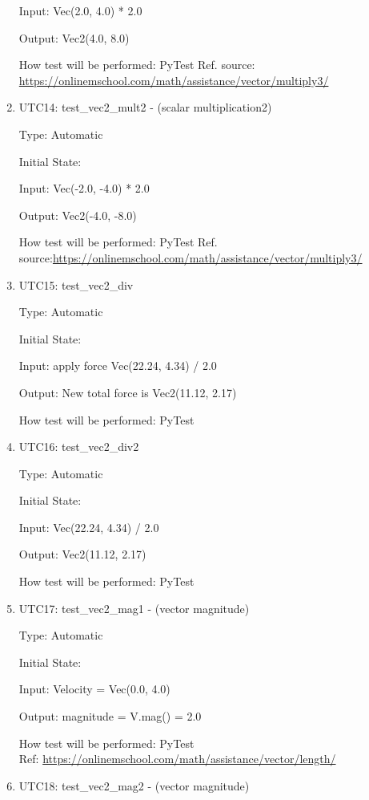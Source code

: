 \documentclass[12pt, titlepage]{article}
\begin{document}
\begin{enumerate}
	Input: Vec(2.0, 4.0) * 2.0
	
	Output: Vec2(4.0, 8.0)
	
	How test will be performed: PyTest
	Ref. source: \url{https://onlinemschool.com/math/assistance/vector/multiply3/}
	
	\item{UTC14}{: test\_vec2\_mult2 - (scalar multiplication2)\\}
	
	Type: Automatic
	
	Initial State: 
	
	Input:  Vec(-2.0, -4.0) * 2.0
	
	Output:  Vec2(-4.0, -8.0)
	
	How test will be performed: PyTest
	Ref. source:\url{https://onlinemschool.com/math/assistance/vector/multiply3/}
	
	\item{UTC15}{: test\_vec2\_div\\}
	
	Type: Automatic
	
	Initial State: 
	
	Input: apply force Vec(22.24, 4.34) / 2.0
	
	Output: New total force is Vec2(11.12, 2.17)
	
	How test will be performed: PyTest
	
	\item{UTC16}{: test\_vec2\_div2\\}
	
	Type: Automatic
	
	Initial State: 
	
	Input: Vec(22.24, 4.34) / 2.0
	
	Output: Vec2(11.12, 2.17)
	
	How test will be performed: PyTest
	
	\item{UTC17}{: test\_vec2\_mag1 - (vector magnitude)\\}
	
	Type: Automatic
	
	Initial State: 
	
	Input: Velocity = Vec(0.0, 4.0)
	
	Output: magnitude = V.mag() = 2.0
	
	How test will be performed: PyTest\\
	Ref: \url{https://onlinemschool.com/math/assistance/vector/length/}
	
	\item{UTC18}{: test\_vec2\_mag2 - (vector magnitude)\\}
	

\end{enumerate}
\end{document}
